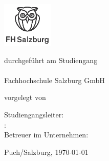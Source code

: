 %

\begin{titlepage}

\centering

\includegraphics[width=2.4cm]{frontmatter/images/fhs_logo.pdf}

\vspace*{1cm}

{%
    \Large
    \textbf{\MakeUppercase{\thesisType}}%
}
\vspace*{1cm}

{
    \Large
    \textbf{\myTitle}
}

\def\temp{\mySubtitle}
\ifx\temp\empty \else
    {
        \large
        \textbf{\mySubtitle}
    }
\fi

\vfill

    durchgeführt am Studiengang\\
    \course\\
    Fachhochschule Salzburg GmbH

\vspace*{1cm}

    vorgelegt von\\\myName

\vfill

    Studiengangsleiter: \bigboss \\[1ex]
    \supervisor: \thesupervisor \\[1ex]
    Betreuer im Unternehmen: \companyboss

\vspace{1cm}

    Puch/Salzburg, \today %

\vspace{1cm}

\end{titlepage}
